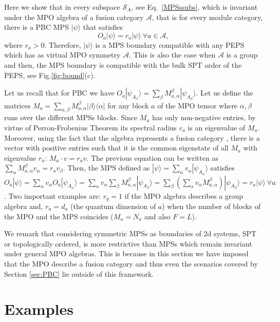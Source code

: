 \documentclass[a4paper,twocolumn,11pt,accepted=2023-02-10]{quantumarticle}
\begin{document}
Here we show that in every subspace $\mathcal{S}_A$, see Eq.\ \eqref{MPSssubs}, which is  invariant under the MPO algebra of a fusion category $\mathcal{A}$, that is for every module category, there is a PBC MPS $|\psi \rangle$ that satisfies 
\begin{equation}\label{symboundary}
    O_a |\psi \rangle = r_a |\psi \rangle \ \forall a\in \mathcal{A},
\end{equation} 
where $r_a>0$. Therefore, $|\psi \rangle$ is a MPS boundary compatible with any PEPS which has as virtual MPO symmetry $\mathcal{A}$. This is also the case when $\mathcal{A}$ is a group and then, the MPS boundary is compatible with the bulk SPT order of the PEPS, see Fig.\ref{fig:bound}(c).

Let us recall that for PBC we have $O_a |\psi_{A_\alpha}\rangle =  \sum_\beta M_{a,\alpha}^\beta |\psi_{A_\beta}\rangle$. Let us define the matrices $M_a= \sum_{\alpha,\beta} M_{a,\alpha}^{\beta}|\beta\rangle \langle \alpha|$ for any block $a$ of the MPO tensor where $\alpha,\beta$ runs over the different MPSs blocks. Since $M_a$ has only non-negative entries, by virtue of Perron-Frobenius Theorem its spectral radius $r_a$ is an eigenvalue of $M_a$. Moreover, using the fact that the algebra represents a fusion category \cite{EGNObook}, there is a vector with positive entries such that it is the common eigenstate of all $M_a$ with eigenvalue $r_a$: $M_a {\cdot} v = r_a v$. The previous equation can be written as $ \sum_\alpha M_{a,\alpha}^\beta v_\alpha = r_a v_\beta$. Then, the MPS defined as $|\psi \rangle = \sum_\alpha v_\alpha |\psi_{A_\alpha} \rangle$ satisfies
$ O_a |\psi \rangle = \sum_\alpha  v_\alpha O_a|\psi_{A_\alpha} \rangle = 
\sum_\alpha  v_\alpha \sum_\beta M_{a,\alpha}^\beta |\psi_{A_\beta}\rangle =
\sum_\beta (\sum_\alpha  v_\alpha  M_{a,\alpha}^\beta) |\psi_{A_\beta}\rangle 
=r_a |\psi \rangle \ \forall a$. Two important examples are: $r_g =  1$ if the MPO algebra describes a group algebra and, $r_a=d_a$ (the quantum dimension of $a$) when the number of blocks of the MPO and the MPS coincides ($M_a=N_a$ and also ${F}={L}$).


We remark that considering symmetric MPSs as boundaries of 2d systems, SPT or topologically ordered, is more restrictive than MPSs which remain invariant under general MPO algebras. This is because in this section we have imposed that the MPO describe a fusion category and thus even the scenarios covered by Section \ref{sec:PBC} lie outside of this framework.

%
\section{Examples}\label{sec:examples}
%
\end{document}
